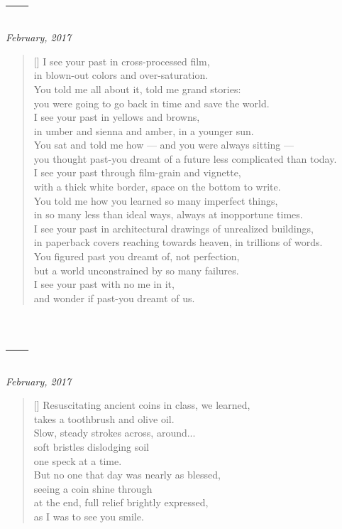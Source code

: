 \section{---}

\hfill\textit{February, 2017}

\begin{verse}[\textwidth]
  I see your past in cross-processed film,\\
  in blown-out colors and over-saturation.\\
  \vin You told me all about it, told me grand stories:\\
  \vin you were going to go back in time and save the world.\\
  I see your past in yellows and browns,\\
  in umber and sienna and amber, in a younger sun.\\
  \vin You sat and told me how --- and you were always sitting ---\\
  \vin you thought past-you dreamt of a future less complicated than today.\\
  I see your past through film-grain and vignette,\\
  with a thick white border, space on the bottom to write.\\
  \vin You told me how you learned so many imperfect things,\\
  \vin in so many less than ideal ways, always at inopportune times.\\
  I see your past in architectural drawings of unrealized buildings,\\
  in paperback covers reaching towards heaven, in trillions of words.\\
  \vin You figured past you dreamt of, not perfection,\\
  \vin but a world unconstrained by so many failures.\\
  I see your past with no me in it,\\
  and wonder if past-you dreamt of us.
\end{verse}
\newpage

\section{---}

\hfill\textit{February, 2017}

\begin{verse}[\textwidth]
  Resuscitating ancient coins in class, we learned,\\
  takes a toothbrush and olive oil.\\
  Slow, steady strokes across, around...\\
  soft bristles dislodging soil\\
  one speck at a time.\\
  But no one that day was nearly as blessed,\\
  seeing a coin shine through\\
  at the end, full relief brightly expressed,\\
  as I was to see you smile.
\end{verse}
\newpage

